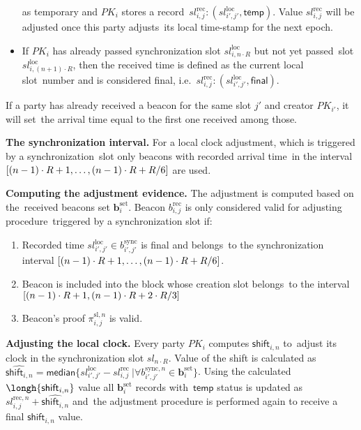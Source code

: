 \begin{legal}
\begin{itemize}
        as temporary and $PK_i$ stores a record\
        ${{sl^{\text{rec}}_{i, j}}: (sl_{i', j'}^{\text{loc}}, \textsf{temp})}$.
        Value ${{sl^{\text{rec}}_{i, j}}}$ will be adjusted once this party adjusts\
        its local time-stamp for the next epoch.
        \item If $PK_i$ has already passed synchronization slot $sl_{i, n \cdot R}^{\text{loc}}$ but not yet passed\
        slot $sl_{i, (n + 1) \cdot R}^{\text{loc}}$, then the received time is defined as the current local slot\
        number and is considered final, i.e.\
        ${{sl^{\text{rec}}_{i, j}}: (sl_{i', j'}^{\text{loc}}, \textsf{final})}$.
    \end{itemize}
    If a party has already received a beacon for the same slot $j'$ and creator $PK_{i'}$, it will set\
    the arrival time equal to the first one received among those.
    \item[]\textbf{The synchronization interval.} For a local clock adjustment, which is triggered by a synchronization\
    slot only beacons with recorded arrival time\
    in the interval ${[(n - 1) \cdot R + 1,\dots,(n-1) \cdot R + R \// 6]}$ are used.
    \item[]\textbf{Computing the adjustment evidence.} The adjustment is computed based on the\
    received beacons set $\mathbf{b}_i^{\text{set}}$.
    Beacon ${b^{\text{rec}}_{i, j}}$ is only considered valid for adjusting procedure\
    triggered by a synchronization slot if:
    \begin{enumerate}
        \item Recorded time ${sl_{i', j'}^{\text{loc}} \in b_{i', j'}^{\text{sync}}}$ is final and belongs\
        to the synchronization interval ${[(n - 1) \cdot R + 1,\dots,(n-1) \cdot R + R \// 6]}$.
        \item Beacon is included into the block whose creation slot belongs\
        to the interval ${[(n - 1) \cdot R + 1, (n - 1) \cdot R + 2 \cdot R \// 3]}$
        \item Beacon's proof $\pi_{i, j}^{\text{sl}, n}$ is valid.
    \end{enumerate}
    \item[]\textbf{Adjusting the local clock.} Every party $PK_i$ computes $\textsf{shift}_{i, n}$ to\
    adjust its clock in the synchronization slot $sl_{n \cdot R}$.
    Value of the shift is calculated as\
    ${\hat{\textsf{shift}_{i, n}} = \textsf{median} \{sl_{i', j'}^{\text{loc}} - sl^{\text{rec}}_{i, j}\
    | \forall b_{i', j'}^{\text{sync}, n} \in \mathbf{b}_i^{\text{set}}\}}$.
    Using the calculated ${\longh{\textsf{shift}_{i, n}}}$ value all $\mathbf{b}_i^{\text{set}}$ records with\
    $\textsf{temp}$ status is updated as ${sl^{\text{rec}, n}_{i, j} + \hat{\textsf{shift}_{i, n}}}$ and\
    the adjustment procedure is performed again to receive a final $\textsf{shift}_{i, n}$ value.
\end{legal}


